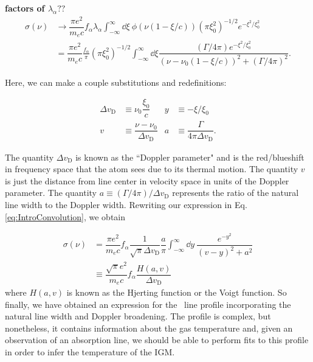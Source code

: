{\bf factors of $\lambda_{\alpha}??$}
\begin{align}
\sigma(\nu) &\to \dfrac{\pi e^2}{m_e c}f_{\alpha}\lambda_{\alpha} \int_{-\infty}^{\infty}\dd \xi\ \phi(\nu(1 - \xi/c)) \left(\pi \xi_{0}^{2} \right)^{-1/2} e^{-\xi^2/\xi_{0}^2} \\
&= \dfrac{\pi e^2}{m_e c} \frac{f_{\alpha}}{\pi} \left( \pi \xi_0^2 \right)^{-1/2} \int_{-\infty}^{\infty} \dd \xi \dfrac{(\Gamma/4\pi) e^{-\xi^2/\xi_{0}^{2}}}{(\nu-\nu_{0}(1-\xi/c))^2+(\Gamma/4\pi)^2}. \label{eq:IntroConvolution}
\end{align}

Here, we can make a couple substitutions and redefinitions:

\begin{align}
\Delta v_{\text{D}} &\equiv \nu_{0}\dfrac{\xi_{0}}{c} & y &\equiv -\xi/\xi_0 \\
v &\equiv \dfrac{\nu - \nu_{0}}{\Delta v_{\text{D}}} & a &\equiv \dfrac{\Gamma}{4\pi \Delta v_{\text{D}}}.
\end{align}

The quantity $\Delta v_{\text{D}}$ is known as the ``Doppler parameter" and is the red/blueshift in frequency space that the atom sees due to its thermal motion. The quantity $v$ is just the distance from line center in velocity space in units of the Doppler parameter. The quantity $a \equiv (\Gamma/4\pi)/\Delta v_{\text{D}}$ represents the ratio of the natural line width to the Doppler width. Rewriting our expression in Eq. \ref{eq:IntroConvolution}, we obtain

\begin{align}
\sigma(\nu) &= \dfrac{\pi e^2}{m_e c}f_{\alpha}\dfrac{1}{\sqrt{\pi}\Delta v_{\text{D}}} \dfrac{a}{\pi}\int_{-\infty}^{\infty}\dd y\ \dfrac{e^{-y^2}}{(v-y)^2+a^2}\\ 
&\equiv \dfrac{\sqrt{\pi} e^2}{m_e c} f_{\alpha}\dfrac{H(a,v)}{\Delta v_{\text{D}}}
\end{align}
where $H(a,v)$ is known as the Hjerting function  or the Voigt function. So finally, we have obtained an expression for the \lya\ line profile incorporating the natural line width and Doppler broadening. The profile is complex, but nonetheless, it contains information about the gas temperature and, given an observation of an absorption line, we should be able to perform fits to this profile in order to infer the temperature of the IGM.

